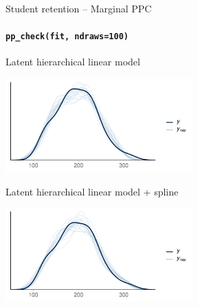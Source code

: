 \documentclass[english,t]{beamer}
\begin{document}
\begin{frame}[fragile]{Student retention -- Marginal PPC}
\framesubtitle{\texttt{pp\_check(fit, ndraws=100)}}

  
\vspace{-0.75\baselineskip}  
Latent hierarchical linear model\\  
  \begin{minipage}[t][3.6cm][t]{1.0\linewidth}
    \includegraphics[height=3.6cm]{student_retention_lbinom_ppc_dens_overlay.pdf}
  \end{minipage}
  
\vspace{-0.5\baselineskip}  
Latent hierarchical linear model + spline\\  
  \begin{minipage}[t][3.6cm][t]{1.0\linewidth}
    \includegraphics[height=3.6cm]{student_retention_sbinom_ppc_dens_overlay.pdf}
  \end{minipage}  

\end{frame}
\end{document}

